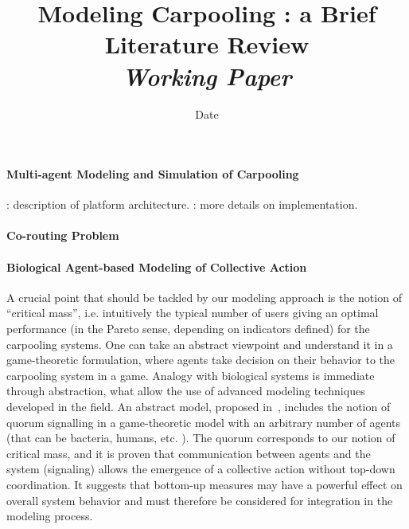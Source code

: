 


\title{Modeling Carpooling : a Brief Literature Review\bigskip\\
\textit{Working Paper}
}

\author{}
\date{Date}


\maketitle

\justify


\begin{abstract}

\end{abstract}




\paragraph{Multi-agent Modeling and Simulation of Carpooling}

\textbf{}
\cite{Galland2013860} : description of platform architecture.
\cite{galland2014multi} : more details on implementation.




\paragraph{Co-routing Problem}



\paragraph{Biological Agent-based Modeling of Collective Action}

A crucial point that should be tackled by our modeling approach is the notion of ``critical mass'', i.e. intuitively the typical number of users giving an optimal performance (in the Pareto sense, depending on indicators defined) for the carpooling systems. One can take an abstract viewpoint and understand it in a game-theoretic formulation, where agents take decision on their behavior to the carpooling system in a game. Analogy with biological systems is immediate through abstraction, what allow the use of advanced modeling techniques developed in the field. An abstract model, proposed in~\cite{10.1371/journal.pcbi.1004101}, includes the notion of quorum signalling in a game-theoretic model with an arbitrary number of agents (that can be bacteria, humans, etc. ). The quorum corresponds to our notion of critical mass, and it is proven that communication between agents and the system (signaling) allows the emergence of a collective action without top-down coordination. It suggests that bottom-up measures may have a powerful effect on overall system behavior and must therefore be considered for integration in the modeling process.


